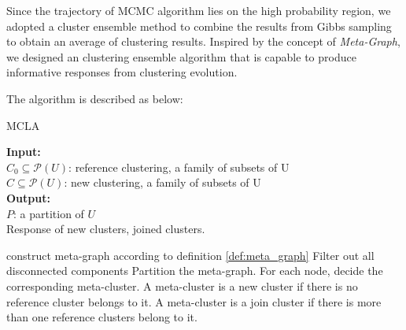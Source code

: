 Since the trajectory of MCMC algorithm lies on the high probability region, we adopted a cluster ensemble method to combine the results from Gibbs sampling to obtain an average of clustering results. Inspired by the concept of \emph{Meta-Graph}, we designed an clustering ensemble algorithm that is capable to produce informative responses from clustering evolution.

The algorithm is described as below:

\begin{algorithm}[H]
\caption{MCLA}
\textbf{Input:}\\
    $C_0 \subseteq \mathcal{P}(U)$: reference clustering, a family of subsets of U\\
    $C \subseteq \mathcal{P}(U)$: new clustering, a family of subsets of U\\

\textbf{Output:}\\
    $P$: a partition of $U$\\
    Response of new clusters, joined clusters.
    
\begin{algorithmic}

 construct meta-graph according to definition \ref{def:meta_graph}
 Filter out all disconnected components
 Partition the meta-graph.
 For each node, decide the corresponding meta-cluster.
 A meta-cluster is a new cluster if there is no reference cluster belongs to it. A meta-cluster is a join cluster if there is more than one reference clusters belong to it.
\end{algorithmic}
\end{algorithm}


